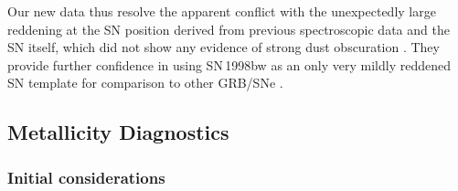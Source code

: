 \documentclass[traditabstract]{aa}
\newcommand{\hb}{H$\beta$}
\newcommand{\hii}{\mbox{H\,{\sc ii}}}
\newcommand{\ebv}{$E_{B-V}\,$}
\newcommand{\oh}{$12+\log(\mathrm{O/H})$}
\begin{document}


Our new data thus resolve the apparent conflict with the unexpectedly large reddening at the SN position derived from previous spectroscopic data \citep{2006A&A...454..103H, 2008A&A...490...45C} and the SN itself, which did not show any evidence of strong dust obscuration \citep[e.g.][]{1998Natur.395..672I, 2001ApJ...555..900P}. They provide further confidence in using SN\,1998bw as an only very mildly reddened SN template for comparison to other GRB/SNe \citep[e.g.][and numerous references therein]{2004ApJ...609..952Z, 2016arXiv160606791K}.

\subsection{Metallicity Diagnostics}

\subsubsection{Initial considerations}

\end{document}
